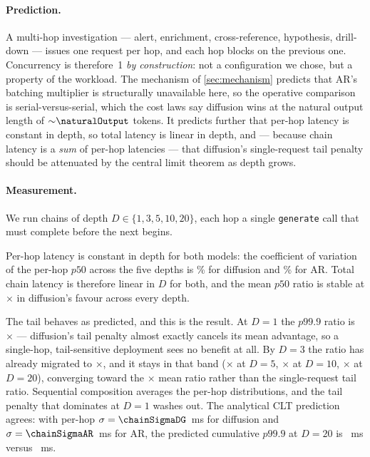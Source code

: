 \paragraph{Prediction.} A multi-hop investigation --- alert, enrichment,
cross-reference, hypothesis, drill-down --- issues one request per hop, and each
hop blocks on the previous one. Concurrency is therefore~1 \emph{by
construction}: not a configuration we chose, but a property of the workload.
The mechanism of \cref{sec:mechanism} predicts that AR's batching multiplier is
structurally unavailable here, so the operative comparison is serial-versus-serial,
which the cost laws say diffusion wins at the natural output length of
${\sim}\naturalOutput$ tokens. It predicts further that per-hop latency is
constant in depth, so total latency is linear in depth, and --- because chain
latency is a \emph{sum} of per-hop latencies --- that diffusion's single-request
tail penalty should be attenuated by the central limit theorem as depth grows.

\paragraph{Measurement.} We run chains of depth $D \in \{1,3,5,10,20\}$, each
hop a single \texttt{generate} call that must complete before the next begins.

Per-hop latency is constant in depth for both models: the coefficient of
variation of the per-hop $p50$ across the five depths is \chainSlopeCVdg\% for
diffusion and \chainSlopeCVar\% for AR. Total chain latency is therefore linear
in $D$ for both, and the mean $p50$ ratio is stable at \chainMeanRatio$\times$
in diffusion's favour across every depth.

The tail behaves as predicted, and this is the result. At $D=1$ the
$p99.9$ ratio is \chainTailRatioDOne$\times$ --- diffusion's tail penalty almost
exactly cancels its mean advantage, so a single-hop, tail-sensitive deployment
sees no benefit at all. By $D=3$ the ratio has already migrated to
$\times$, and it stays in that band
($\times$ at $D=5$,
$\times$ at $D=10$,
\chainTailRatioDTwenty$\times$ at $D=20$), converging toward the
\chainMeanRatio$\times$ mean ratio rather than the single-request tail ratio.
Sequential composition averages the per-hop distributions, and the tail penalty
that dominates at $D=1$ washes out. The analytical CLT prediction agrees: with
per-hop $\sigma = \chainSigmaDG$~ms for diffusion and $\sigma = \chainSigmaAR$~ms
for AR, the predicted cumulative $p99.9$ at $D=20$ is
~ms versus
~ms.

